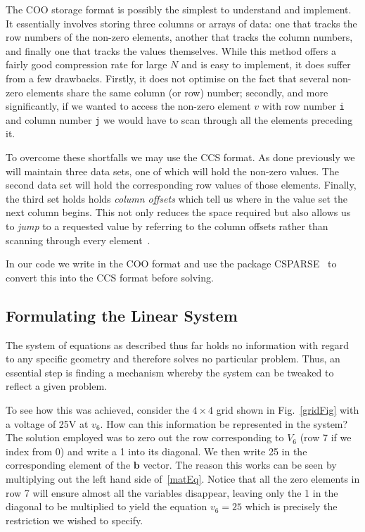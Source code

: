 \documentclass[a4paper]{article}
\newcommand{\vect}[1]{\bm{#1}}
\begin{document}
The COO storage format is possibly the simplest to understand and implement. It
essentially involves storing three columns or arrays of data: one that tracks
the row numbers of the non-zero elements, another that tracks the column
numbers, and finally one that tracks the values themselves. While this method
offers a fairly good compression rate for large $N$ and is easy to implement,
it does suffer from a few drawbacks. Firstly, it does not optimise on the fact
that several non-zero elements share the same column (or row) number; secondly,
and more significantly, if we wanted to access the non-zero element $v$ with
row number \texttt{i} and column number \texttt{j} we would have to scan
through all the elements preceding it.

To overcome these shortfalls we may use the CCS format. As done previously we
will maintain three data sets, one of which will hold the non-zero values. The
second data set will hold the corresponding row values of those elements.
Finally, the third set holds holds \emph{column offsets} which tell us where in
the value set the next column begins. This not only reduces the space required
but also allows us to \emph{jump} to a requested value by referring to the
column offsets rather than scanning through every element~\cite{101matstore}.

In our code we write in the COO format and use the package
CSPARSE~\cite{csparse} to convert this into the CCS format before solving.

\subsection{Formulating the Linear System}
The system of equations as described thus far holds no information with regard
to any specific geometry and therefore solves no particular problem. Thus, an
essential step is finding a mechanism whereby the system can be tweaked to
reflect a given problem.

To see how this was achieved, consider the $4 \times 4$ grid shown
in Fig.~\ref{gridFig} with a voltage of 25V at $v_6$. How can this information
be represented in the system? The solution employed was to zero out the row
corresponding to $V_6$ (row 7 if we index from 0) and write a 1 into its
diagonal. We then write 25 in the corresponding element of the $\vect{b}$
vector. The reason this works can be seen by multiplying out the left hand side
of~\eqref{matEq}. Notice that all the zero elements in row 7 will ensure almost
all the variables disappear, leaving only the 1 in the diagonal to be
multiplied to yield the equation $v_6=25$ which is precisely the restriction we
wished to specify.
\end{document}
